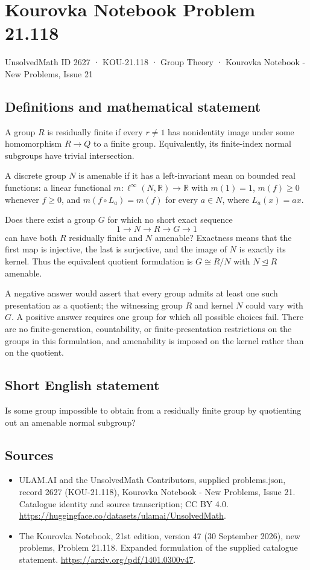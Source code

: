 \documentclass[11pt,a4paper]{article}
\begin{document}
\section*{Kourovka Notebook Problem 21.118}\label{2627}
{\small UnsolvedMath ID 2627 · KOU-21.118 · Group Theory · Kourovka Notebook - New Problems, Issue 21}
\subsection{Definitions and mathematical statement}
A group $R$ is residually finite if every $r\ne1$ has nonidentity image under some homomorphism $R\to Q$ to a finite group. Equivalently, its finite-index normal subgroups have trivial intersection.

A discrete group $N$ is amenable if it has a left-invariant mean on bounded real functions: a linear functional $m:\ell^\infty(N,\mathbb R)\to\mathbb R$ with $m(1)=1$, $m(f)\ge0$ whenever $f\ge0$, and $m(f\circ L_a)=m(f)$ for every $a\in N$, where $L_a(x)=ax$.

Does there exist a group $G$ for which no short exact sequence
\[
 1\longrightarrow N\longrightarrow R\longrightarrow G\longrightarrow1
\]
can have both $R$ residually finite and $N$ amenable? Exactness means that the first map is injective, the last is surjective, and the image of $N$ is exactly its kernel. Thus the equivalent quotient formulation is $G\cong R/N$ with $N\trianglelefteq R$ amenable.

A negative answer would assert that every group admits at least one such presentation as a quotient; the witnessing group $R$ and kernel $N$ could vary with $G$. A positive answer requires one group for which all possible choices fail. There are no finite-generation, countability, or finite-presentation restrictions on the groups in this formulation, and amenability is imposed on the kernel rather than on the quotient.
\subsection{Short English statement}
Is some group impossible to obtain from a residually finite group by quotienting out an amenable normal subgroup?
\subsection{Sources}
\begin{itemize}
\item[S1] ULAM.AI and the UnsolvedMath Contributors, supplied problems.json, record 2627 (KOU-21.118), Kourovka Notebook - New Problems, Issue 21. Catalogue identity and source transcription; CC BY 4.0.
\url{https://huggingface.co/datasets/ulamai/UnsolvedMath}.
\item[S2] The Kourovka Notebook, 21st edition, version 47 (30 September 2026), new problems, Problem 21.118. Expanded formulation of the supplied catalogue statement.
\url{https://arxiv.org/pdf/1401.0300v47}.
\end{itemize}
\end{document}
